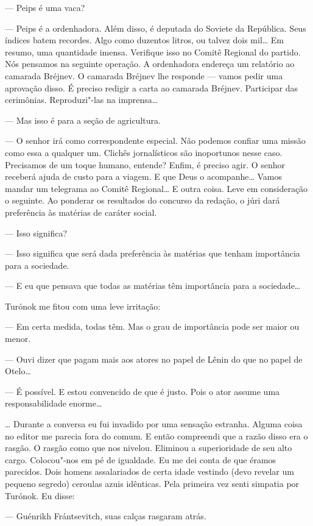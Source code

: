 --- Peips é uma vaca?

--- Peips é a ordenhadora. Além disso, é deputada do Soviete da
República. Seus índices batem recordes. Algo como duzentos litros, ou
talvez dois mil\ldots{} Em resumo, uma quantidade imensa. Verifique isso no
Comitê Regional do partido. Nós pensamos na seguinte operação. A
ordenhadora endereça um relatório ao camarada Bréjnev. O camarada
Bréjnev lhe responde --- vamos pedir uma aprovação disso. É
preciso redigir a carta ao camarada Bréjnev. Participar das cerimônias.
Reproduzi"-las na imprensa\ldots{}

--- Mas isso é para a seção de agricultura.

--- O senhor irá como correspondente especial. Não podemos
confiar uma missão como essa a qualquer um. Clichês jornalísticos são
inoportunos nesse caso. Precisamos de um toque humano, entende? Enfim, é
preciso agir. O senhor receberá ajuda de custo para a viagem. E que Deus
o acompanhe\ldots{} Vamos mandar um telegrama ao Comitê Regional\ldots{} E outra
coisa. Leve em consideração o seguinte. Ao ponderar os resultados do
concurso da redação, o júri dará preferência às matérias de caráter
social.

--- Isso significa?

--- Isso significa que será dada preferência às matérias que
tenham importância para a sociedade.

--- E eu que pensava que todas as matérias têm importância para a
sociedade\ldots{}

Turónok me fitou com uma leve irritação:

--- Em certa medida, todas têm. Mas o grau de importância pode
ser maior ou menor.

--- Ouvi dizer que pagam mais aos atores no papel de Lênin do que
no papel de Otelo\ldots{}

--- É possível. E estou convencido de que é justo. Pois o ator
assume uma responsabilidade enorme\ldots{}

\ldots{} Durante a conversa eu fui invadido por uma sensação estranha. Alguma
coisa no editor me parecia fora do comum. E então compreendi que a razão
disso era o rasgão. O rasgão como que nos nivelou. Eliminou a
superioridade de seu alto cargo. Colocou"-nos em pé de igualdade. Eu me
dei conta de que éramos parecidos. Dois homens assalariados de certa
idade vestindo (devo revelar um pequeno segredo) ceroulas azuis
idênticas. Pela primeira vez senti simpatia por Turónok. Eu disse:

--- Guénrikh Frántsevitch, suas calças rasgaram atrás.


